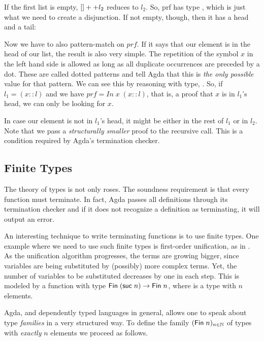 
If the first list is empty, $[] ++ l_2$ reduces to $l_2$. So, prf has type , which
is just what we need to create a disjunction. If not empty, though, then it has a head and a tail:


 Now we have to also pattern-match
on $prf$. If it says that our element is in the head of our list, the result is also very simple.
The repetition of the symbol $x$ in the left hand side is allowed as long as all duplicate occurrences
are preceded by a dot. These are called dotted patterns and tell Agda that this is \emph{the only possible}
value for that pattern. We can see this by reasoning with  type, . 
So, if $l_1 = (x :: l)$ and we have $prf = In\; x\; (x :: l)$, that is, a proof that $x$ is in $l_1$'s head,
we can only be looking for $x$. 


In case our element is not in $l_1$'s head, it might be either in the rest of $l_1$ or in $l_2$.
Note that we pass a \emph{structurally smaller} proof to the recursive call. This is a condition required by
Agda's termination checker.

\subsection{Finite Types}

The theory of types is not only roses. The soundness requirement is that every function must
terminate. In fact, Agda passes all definitions through its termination checker and if
it does not recognize a definition as terminating, it will output an error.

An interesting technique to write terminating functions is to use finite types. One example
where we need to use such finite types is first-order unification, as in \cite{mcbride03}.
As the unification algorithm progresses, the terms are growing bigger, since variables are being
substituted by (possibly) more complex terms. Yet, the number of variables to be substituted
decreases by one in each step. This is modeled by a function with type $\D{Fin}\;(\IC{suc}\;n) \rightarrow \D{Fin}\;n$,
where  is a type with $n$ elements. 

Agda, and dependently typed languages in general, allows one to speak about type \emph{families}
in a very structured way. To define the family $(\D{Fin}\;n)_{n \in \mathbb{N}}$ of types with 
\emph{exactly} $n$ elements we proceed as follows.

